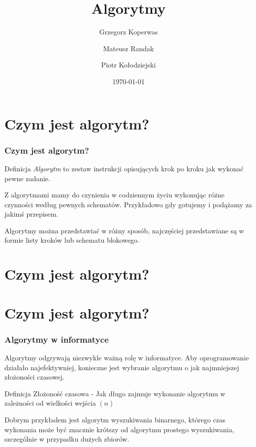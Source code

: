 \documentclass{beamer}
\title{Algorytmy}
\author{Grzegorz Koperwas \and Mateusz Randak \and Piotr Kołodziejski}
\date{\today}
\newcommand{\obrazek}[2]{
        \begin{figure}[h]
            \centering
            \texttt{[image: \#2]}
        \end{figure}
    }
\begin{document}
\begin{frame}
    \titlepage
\end{frame}

\section{Czym jest algorytm?}
\begin{frame}
    \frametitle{Czym jest algorytm?}
    
    \begin{block}{Definicja}
        \emph{Algorytm} to zestaw instrukcji opisujących krok po kroku jak wykonać pewne zadanie.
    \end{block}
    
   Z algorytmami mamy do czynienia w codziennym życiu wykonując różne czynności według pewnych schematów. Przykładowo gdy gotujemy i podążamy za jakimś przepisem.
   
   Algorytmy można przedstawiać w różny sposób, najczęściej przedstawiane są w formie listy kroków lub schematu blokowego.
\end{frame}

\section{Czym jest algorytm?}

\section{Czym jest algorytm?}
\begin{frame}
     \frametitle{Algorytmy w informatyce}

    Algorytmy odgrywają niezwykle ważną rolę w informatyce. Aby oprogramowanie działało najefektywniej, konieczne jest wybranie algorytmu o jak najmniejszej złożoności czasowej. 
    
     \begin{block}{Definicja}
        Złożoność czasowa - Jak długo zajmuje wykonanie algorytmu w zależności od wielkości wejścia $\left(n\right)$
    \end{block}
    
	Dobrym przykładem jest algorytm wyszukiwania binarnego, którego czas wykonania może być znacznie krótszy od algorytmu prostego wyszukiwania, szczególnie w przypadku dużych zbiorów.

\end{frame}
\end{document}
